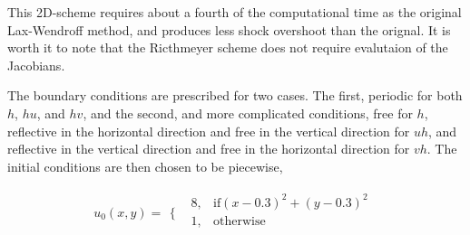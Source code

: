 This 2D-scheme requires about a fourth of the computational time as the original Lax-Wendroff method, and produces less shock
overshoot than the orignal\cite{Roach}. It is worth it to note that the Ricthmeyer scheme does not require evalutaion
of the Jacobians. 
\newline

The boundary conditions are prescribed for two cases. The first, periodic for both $h$, $hu$, and $hv$, and the second,
and more complicated conditions, free for $h$, reflective in the horizontal direction and free in the vertical direction 
for $uh$, and reflective in the vertical direction and free in the horizontal direction for $vh$. 
The initial conditions are then chosen to be piecewise, 

\begin{equation}\label{eqn:12}
u_0(x,y)=
\begin{array}{ll}
\Big\{ & 
\begin{array}{ll}
 8, & \text{if} (x-0.3)^2+(y-0.3)^2 \\
 1, & \text{otherwise} \\
\end{array}
\end{array}
\end{equation}

